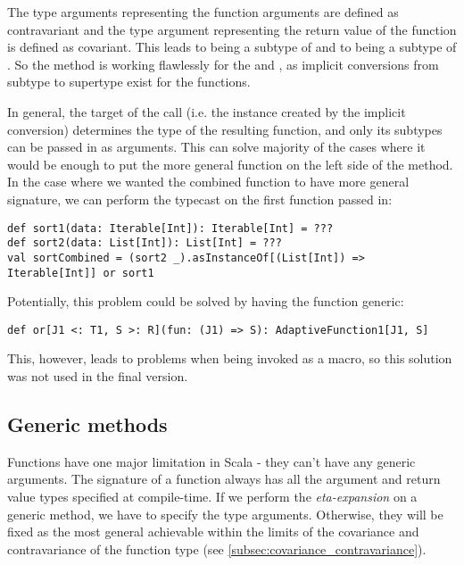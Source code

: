 The type arguments representing the function arguments are defined as contravariant and the type argument representing the return value of the function is defined as covariant. This leads to  being a subtype of  and to  being a subtype of . So the  method is working flawlessly for the  and , as implicit conversions from subtype to supertype exist for the functions.

In general, the target of the  call (i.e. the  instance created by the implicit conversion) determines the type of the resulting function, and only its subtypes can be passed in as arguments. This can solve majority of the cases where it would be enough to put the more general function on the left side of the  method. In the case where we wanted the combined function to have more general signature, we can perform the typecast on the first function passed in:

\lstset{style=Scala}
\begin{lstlisting}
def sort1(data: Iterable[Int]): Iterable[Int] = ???
def sort2(data: List[Int]): List[Int] = ???
val sortCombined = (sort2 _).asInstanceOf[(List[Int]) => Iterable[Int]] or sort1
\end{lstlisting}

Potentially, this problem could be solved by having the  function generic:
\lstset{style=Scala}
\begin{lstlisting}
def or[J1 <: T1, S >: R](fun: (J1) => S): AdaptiveFunction1[J1, S]
\end{lstlisting}
This, however, leads to problems when being invoked as a macro, so this solution was not used in the final version.

\subsection{Generic methods}
\label{subsec:generics}



Functions have one major limitation in Scala - they can't have any generic arguments. The signature of a function always has all the argument and return value types specified at compile-time. If we perform the \textit{eta-expansion} on a generic method, we have to specify the type arguments. Otherwise, they will be fixed as the most general achievable within the limits of the covariance and contravariance of the function type (see \ref{subsec:covariance_contravariance}).

